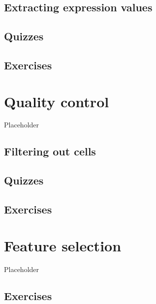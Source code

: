 \documentclass[
]{book}
\begin{document}
\hypertarget{extracting-expression-values}{%
\section{Extracting expression values}\label{extracting-expression-values}}

\hypertarget{quizzes-1}{%
\section{Quizzes}\label{quizzes-1}}

\hypertarget{exercises}{%
\section{Exercises}\label{exercises}}

\hypertarget{quality-control}{%
\chapter{Quality control}\label{quality-control}}

Placeholder

\hypertarget{filtering-out-cells}{%
\section{Filtering out cells}\label{filtering-out-cells}}

\hypertarget{quizzes-2}{%
\section{Quizzes}\label{quizzes-2}}

\hypertarget{exercises-1}{%
\section{Exercises}\label{exercises-1}}

\hypertarget{feature-selection}{%
\chapter{Feature selection}\label{feature-selection}}

Placeholder

\hypertarget{exercises-2}{%
\section{Exercises}\label{exercises-2}}
\end{document}
